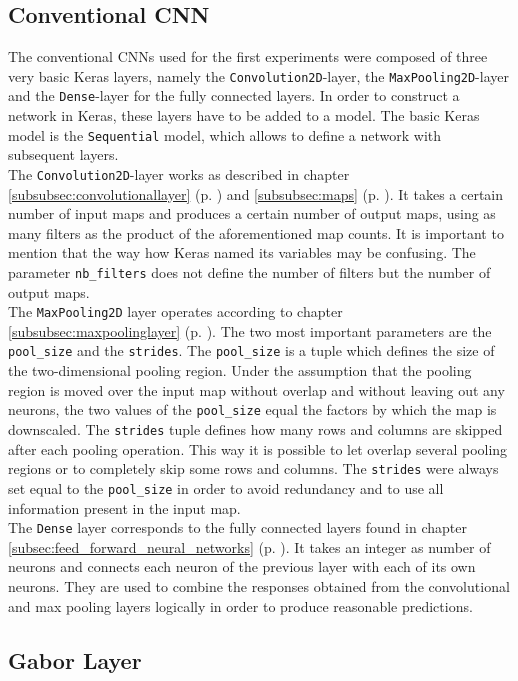 \documentclass[11pt, a4paper]{article}
\newcommand\myref[1]{\ref{#1} (p. \pageref{#1})}
\begin{document}
\begin{appendix}
\subsection{Conventional CNN}

The conventional \acp{CNN} used for the first experiments were composed of three very basic Keras layers, namely the \texttt{Convolution2D}-layer, the \texttt{MaxPooling2D}-layer and the \texttt{Dense}-layer for the fully connected layers. In order to construct a network in Keras, these layers have to be added to a model. The basic Keras model is the \texttt{Sequential} model, which allows to define a network with subsequent layers.\\
The \texttt{Convolution2D}-layer works as described in chapter \myref{subsubsec:convolutionallayer} and \myref{subsubsec:maps}. It takes a certain number of input maps and produces a certain number of output maps, using as many filters as the product of the aforementioned map counts. It is important to mention that the way how Keras named its variables may be confusing. The parameter \texttt{nb\_filters} does not define the number of filters but the number of output maps.\\
The \texttt{MaxPooling2D} layer operates according to chapter \myref{subsubsec:maxpoolinglayer}. The two most important parameters are the \texttt{pool\_size} and the \texttt{strides}. The \texttt{pool\_size} is a tuple which defines the size of the two-dimensional pooling region. Under the assumption that the pooling region is moved over the input map without overlap and without leaving out any neurons, the two values of the \texttt{pool\_size} equal the factors by which the map is downscaled. The \texttt{strides} tuple defines how many rows and columns are skipped after each pooling operation. This way it is possible to let overlap several pooling regions or to completely skip some rows and columns. The \texttt{strides} were always set equal to the \texttt{pool\_size} in order to avoid redundancy and to use all information present in the input map.\\
The \texttt{Dense} layer corresponds to the fully connected layers found in chapter \myref{subsec:feed_forward_neural_networks}. It takes an integer as number of neurons and connects each neuron of the previous layer with each of its own neurons. They are used to combine the responses obtained from the convolutional and max pooling layers logically in order to produce reasonable predictions.

\subsection{Gabor Layer}
	

\end{appendix}
\end{document}
